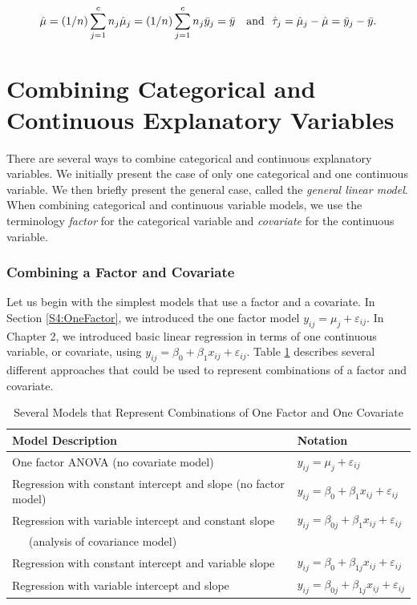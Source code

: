 \begin{equation*}
\hat{\mu}=(1/n)\sum_{j=1}^{c}n_j\hat{\mu}_j=(1/n)\sum_{j=1}^{c}n_j\bar{%
y}_j=\bar{y}\text{ \ \ and \ }\hat{\tau}_j=\hat{\mu}_j-\hat{\mu}=\bar{y%
}_j-\bar{y}.
\end{equation*}

\section{Combining Categorical and Continuous Explanatory Variables}

There are several ways to combine categorical and continuous
explanatory variables. We initially present the case of only one
categorical and one continuous variable. We then briefly present the
general case, called the \textit{general linear model}. When
combining categorical and continuous variable models, we use the
terminology \emph{factor} for the categorical variable and
\emph{covariate} for the continuous variable.

\subsubsection*{Combining a Factor and Covariate}

Let us begin with the simplest models that use a factor and a
covariate. In Section \ref{S4:OneFactor}, we introduced the one
factor model $ y_{ij}=\mu_j + \varepsilon_{ij}.$ In Chapter 2, we introduced basic linear regression in terms of one
continuous variable, or covariate, using $ y_{ij}=\beta_0+\beta_1x_{ij} + \varepsilon_{ij}.$
Table \ref{T4:OneFactorCovariate} describes several
different approaches that could be used to represent combinations of a factor and
covariate.

 \begin{center}  \begin{table}[h]
\caption{\label{T4:OneFactorCovariate}  Several Models that
Represent Combinations of One Factor and One Covariate}
\begin{tabular}{ll}
\hline Model Description & Notation \\ \hline One factor ANOVA (no
covariate model) &
$y_{ij}=\mu_j+\varepsilon_{ij}$ \\
Regression with constant intercept and slope (no factor
model) & $y_{ij}=\beta_0+\beta_1x_{ij}+\varepsilon_{ij}$ \\
Regression with variable intercept and constant slope &
$y_{ij}=\beta_{0j}+\beta_1x_{ij}+\varepsilon_{ij}$ \\
~~~(analysis of covariance model) &  \\
Regression with constant intercept and variable slope &
$y_{ij}=\beta_0+\beta_{1j}x_{ij}+\varepsilon_{ij}$ \\
Regression with variable intercept and slope &
$y_{ij}=\beta_{0j}+\beta_{1j}x_{ij}+\varepsilon_{ij}$ \\
\hline
\end{tabular}
\end{table}  \end{center}  

